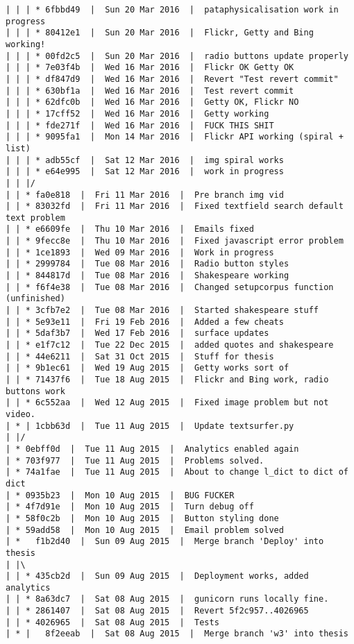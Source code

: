 \begin{verbatim}
| | | * 6fbbd49  |  Sun 20 Mar 2016  |  pataphysicalisation work in progress
| | | * 80412e1  |  Sun 20 Mar 2016  |  Flickr, Getty and Bing working!
| | | * 00fd2c5  |  Sun 20 Mar 2016  |  radio buttons update properly
| | | * 7e03f4b  |  Wed 16 Mar 2016  |  Flickr OK Getty OK
| | | * df847d9  |  Wed 16 Mar 2016  |  Revert "Test revert commit"
| | | * 630bf1a  |  Wed 16 Mar 2016  |  Test revert commit
| | | * 62dfc0b  |  Wed 16 Mar 2016  |  Getty OK, Flickr NO
| | | * 17cff52  |  Wed 16 Mar 2016  |  Getty working
| | | * fde271f  |  Wed 16 Mar 2016  |  FUCK THIS SHIT
| | | * 9095fa1  |  Mon 14 Mar 2016  |  Flickr API working (spiral + list)
| | | * adb55cf  |  Sat 12 Mar 2016  |  img spiral works
| | | * e64e995  |  Sat 12 Mar 2016  |  work in progress
| | |/  
| | * fa0e818  |  Fri 11 Mar 2016  |  Pre branch img vid
| | * 83032fd  |  Fri 11 Mar 2016  |  Fixed textfield search default text problem
| | * e6609fe  |  Thu 10 Mar 2016  |  Emails fixed
| | * 9fecc8e  |  Thu 10 Mar 2016  |  Fixed javascript error problem
| | * 1ce1893  |  Wed 09 Mar 2016  |  Work in progress
| | * 2999784  |  Tue 08 Mar 2016  |  Radio button styles
| | * 844817d  |  Tue 08 Mar 2016  |  Shakespeare working
| | * f6f4e38  |  Tue 08 Mar 2016  |  Changed setupcorpus function (unfinished)
| | * 3cfb7e2  |  Tue 08 Mar 2016  |  Started shakespeare stuff
| | * 5e93e11  |  Fri 19 Feb 2016  |  Added a few cheats
| | * 5daf3b7  |  Wed 17 Feb 2016  |  surface updates
| | * e1f7c12  |  Tue 22 Dec 2015  |  added quotes and shakespeare
| | * 44e6211  |  Sat 31 Oct 2015  |  Stuff for thesis
| | * 9b1ec61  |  Wed 19 Aug 2015  |  Getty works sort of
| | * 71437f6  |  Tue 18 Aug 2015  |  Flickr and Bing work, radio buttons work
| | * 6c552aa  |  Wed 12 Aug 2015  |  Fixed image problem but not video.
| * | 1cbb63d  |  Tue 11 Aug 2015  |  Update textsurfer.py
| |/  
| * 0ebff0d  |  Tue 11 Aug 2015  |  Analytics enabled again
| * 703f977  |  Tue 11 Aug 2015  |  Problems solved.
| * 74a1fae  |  Tue 11 Aug 2015  |  About to change l_dict to dict of dict
| * 0935b23  |  Mon 10 Aug 2015  |  BUG FUCKER
| * 4f7d91e  |  Mon 10 Aug 2015  |  Turn debug off
| * 58f0c2b  |  Mon 10 Aug 2015  |  Button styling done
| * 59add58  |  Mon 10 Aug 2015  |  Email problem solved
| *   f1b2d40  |  Sun 09 Aug 2015  |  Merge branch 'Deploy' into thesis
| |\  
| | * 435cb2d  |  Sun 09 Aug 2015  |  Deployment works, added analytics
| | * 8a63dc7  |  Sat 08 Aug 2015  |  gunicorn runs locally fine.
| | * 2861407  |  Sat 08 Aug 2015  |  Revert 5f2c957..4026965
| | * 4026965  |  Sat 08 Aug 2015  |  Tests
| * |   8f2eeab  |  Sat 08 Aug 2015  |  Merge branch 'w3' into thesis

\end{verbatim}
